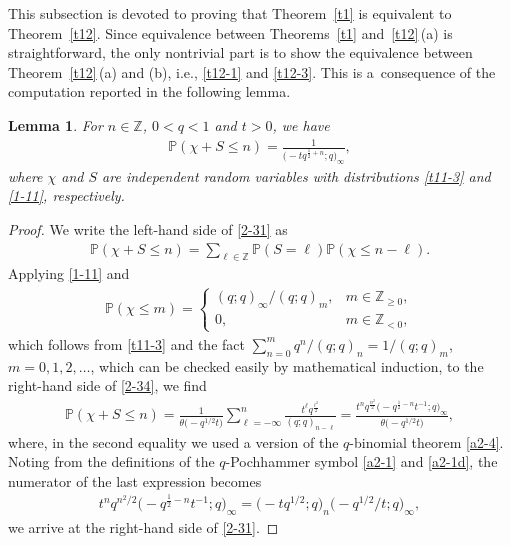 \documentclass[11pt]{article}
\numberwithin{equation}{section}
\numberwithin{equation}{section}
\newtheorem{Lemma}[Theorem]{Lemma}
\def\i{\infty}
\def\P{\mathbb{P}}
\def\Z{\mathbb{Z}}
\begin{document}
This subsection is devoted to proving that Theorem~\ref{t1} is equivalent to Theorem~\ref{t12}. Since equivalence between Theorems~\ref{t1} and~\ref{t12}\,(a) is straightforward, the only nontrivial part is to show the equivalence between Theorem~\ref{t12}\,(a) and (b), i.e., \eqref{t12-1} and \eqref{t12-3}. This is a~consequence of the computation reported in the following lemma.
\begin{Lemma}
\label{l27}
For $n\in\Z$, $0<q<1$ and
$t>0$, we have
 \begin{align}
\label{2-31}
 \P(\chi+S\le n)
 =
 \frac{1}{\bigl(-t q^{\frac12+n};q\bigr)_{\i}},
\end{align}
 where $\chi$ and $S$ are independent random variables with distributions
 \eqref{t11-3} and \eqref{1-11}, respectively.
\end{Lemma}
 \begin{proof}
 We write the left-hand side of \eqref{2-31} as
 \begin{align}
 \label{2-34}
 \P(\chi+S\le n)
 =
 \sum_{\ell\in\Z} \P(S=\ell)\P(\chi\le n-\ell).
 \end{align}
 Applying \eqref{1-11} and
 \begin{align*}
 \P(\chi\le m)=
 \begin{cases}
 (q;q)_{\i}/(q;q)_m,& m\in\Z_{\ge 0},
 \\
 0,& m\in\Z_{< 0},
 \end{cases}
 \end{align*}
 which follows from \eqref{t11-3} and the fact $\sum_{n=0}^mq^n/(q;q)_n=1/(q;q)_m$, $m=0,1,2,\dots$, which can be checked easily by mathematical induction, to the right-hand side of \eqref{2-34}, we find
 \begin{align*}
 \P(\chi+S\le n)
 =
 \frac{1}{\theta\bigl(-q^{1/2}t\bigr)}\sum_{\ell=-\infty}^n
 \frac{t^{\ell}q^{\frac{\ell^2}{2}}}
 {(q;q)_{n-\ell}}
 =
 \frac{t^nq^{\frac{n^2}{2}}\bigl(-q^{\frac12-n}t^{-1};q\bigr)_{\i}}{\theta\bigl(-q^{1/2}t\bigr)},
 \end{align*}
 where, in the second equality we used a version of the $q$-binomial theorem \eqref{a2-4}.
 Noting from the definitions of the $q$-Pochhammer symbol \eqref{a2-1} and \eqref{a2-1d}, the numerator of the last expression becomes
 \begin{align*}
 t^n q^{n^2/2} \bigl(-q^{\frac12-n}t^{-1};q\bigr)_\i
=\bigl(-t q^{1/2};q\bigr)_n \bigl(-q^{1/2}/t;q\bigr)_{\i},
 \end{align*}
 we arrive at the right-hand side of \eqref{2-31}.
 \end{proof}
\end{document}
